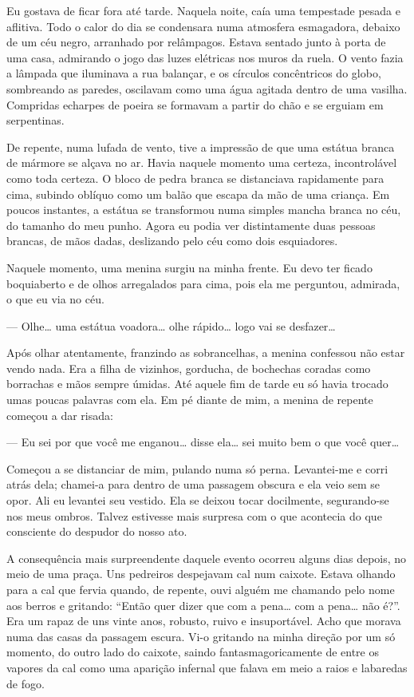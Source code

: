 Eu gostava de ficar fora até tarde. Naquela noite, caía uma tempestade pesada e aflitiva. Todo o calor do dia se condensara numa atmosfera esmagadora, debaixo de um céu negro, arranhado por relâmpagos. Estava sentado junto à porta de uma casa, admirando o jogo das luzes elétricas nos muros da ruela. O vento fazia a lâmpada que iluminava a rua balançar, e os círculos concêntricos do globo, sombreando as paredes, oscilavam como uma água agitada dentro de uma vasilha. Compridas echarpes de poeira se formavam a partir do chão e se erguiam em serpentinas.

De repente, numa lufada de vento, tive a impressão de que uma estátua branca de mármore se alçava no ar. Havia naquele momento uma certeza, incontrolável como toda certeza. O bloco de pedra branca se distanciava rapidamente para cima, subindo oblíquo como um balão que escapa da mão de uma criança. Em poucos instantes, a estátua se transformou numa simples mancha branca no céu, do tamanho do meu punho. Agora eu podia ver distintamente duas pessoas brancas, de mãos dadas, deslizando pelo céu como dois esquiadores.

Naquele momento, uma menina surgiu na minha frente. Eu devo ter ficado boquiaberto e de olhos arregalados para cima, pois ela me perguntou, admirada, o que eu via no céu.

--- Olhe\ldots{} uma estátua voadora\ldots{} olhe rápido\ldots{} logo vai se desfazer\ldots{}

Após olhar atentamente, franzindo as sobrancelhas, a menina confessou não estar vendo nada. Era a filha de vizinhos, gorducha, de bochechas coradas como borrachas e mãos sempre úmidas. Até aquele fim de tarde eu só havia trocado umas poucas palavras com ela. Em pé diante de mim, a menina de repente começou a dar risada:

--- Eu sei por que você me enganou\ldots{} disse ela\ldots{} sei muito bem o que você quer\ldots{}

Começou a se distanciar de mim, pulando numa só perna. Levantei-me e corri atrás dela; chamei-a para dentro de uma passagem obscura e ela veio sem se opor. Ali eu levantei seu vestido. Ela se deixou tocar docilmente, segurando-se nos meus ombros. Talvez estivesse mais surpresa com o que acontecia do que consciente do despudor do nosso ato.

A consequência mais surpreendente daquele evento ocorreu alguns dias depois, no meio de uma praça. Uns pedreiros despejavam cal num caixote. Estava olhando para a cal que fervia quando, de repente, ouvi alguém me chamando pelo nome aos berros e gritando: ``Então quer dizer que com a pena\ldots{} com a pena\ldots{} não é?''. Era um rapaz de uns vinte anos, robusto, ruivo e insuportável. Acho que morava numa das casas da passagem escura. Vi-o gritando na minha direção por um só momento, do outro lado do caixote, saindo fantasmagoricamente de entre os vapores da cal como uma aparição infernal que falava em meio a raios e labaredas de fogo.

